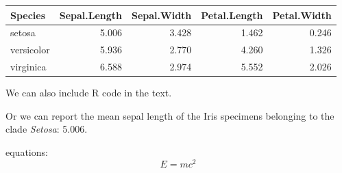 \documentclass[]{article}
\begin{document}
\begin{longtable}[]{@{}lrrrr@{}}
\toprule
Species & Sepal.Length & Sepal.Width & Petal.Length &
Petal.Width\tabularnewline
\midrule
\endhead
setosa & 5.006 & 3.428 & 1.462 & 0.246\tabularnewline
versicolor & 5.936 & 2.770 & 4.260 & 1.326\tabularnewline
virginica & 6.588 & 2.974 & 5.552 & 2.026\tabularnewline
\bottomrule
\end{longtable}

We can also include R code in the text.

Or we can report the mean sepal length of the Iris specimens belonging
to the clade \emph{Setosa}: 5.006.

equations: \[E =mc^{2}\]
\end{document}
